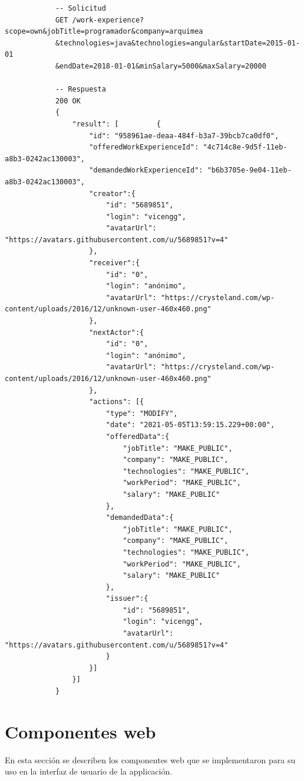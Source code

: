 \documentclass[a4paper, 12pt]{book}
\begin{document}
        {\footnotesize
    \begin{verbatim}
			-- Solicitud
			GET /work-experience?scope=own&jobTitle=programador&company=arquimea
			&technologies=java&technologies=angular&startDate=2015-01-01
			&endDate=2018-01-01&minSalary=5000&maxSalary=20000

			-- Respuesta
			200 OK
			{
			    "result": [			{
			        "id": "958961ae-deaa-484f-b3a7-39bcb7ca0df0",
			        "offeredWorkExperienceId": "4c714c8e-9d5f-11eb-a8b3-0242ac130003",
			        "demandedWorkExperienceId": "b6b3705e-9e04-11eb-a8b3-0242ac130003",
			        "creator":{
			            "id": "5689851",
			            "login": "vicengg",
			            "avatarUrl": "https://avatars.githubusercontent.com/u/5689851?v=4"
			        },
			        "receiver":{
			            "id": "0",
			            "login": "anónimo",
			            "avatarUrl": "https://crysteland.com/wp-content/uploads/2016/12/unknown-user-460x460.png"
			        },
			        "nextActor":{
			            "id": "0",
			            "login": "anónimo",
			            "avatarUrl": "https://crysteland.com/wp-content/uploads/2016/12/unknown-user-460x460.png"
			        },
			        "actions": [{
			            "type": "MODIFY",
			            "date": "2021-05-05T13:59:15.229+00:00",
			            "offeredData":{
			                "jobTitle": "MAKE_PUBLIC",
			                "company": "MAKE_PUBLIC",
			                "technologies": "MAKE_PUBLIC",
			                "workPeriod": "MAKE_PUBLIC",
			                "salary": "MAKE_PUBLIC"
			            },
			            "demandedData":{
			                "jobTitle": "MAKE_PUBLIC",
			                "company": "MAKE_PUBLIC",
			                "technologies": "MAKE_PUBLIC",
			                "workPeriod": "MAKE_PUBLIC",
			                "salary": "MAKE_PUBLIC"
			            },
			            "issuer":{
			                "id": "5689851",
			                "login": "vicengg",
			                "avatarUrl": "https://avatars.githubusercontent.com/u/5689851?v=4"
			            }
			        }]
			    }]
			}
    \end{verbatim}
    }


    \section{Componentes web}
    \label{sec:web_components}
    En esta sección se describen los componentes web que se implementaron para su uso en la interfaz de usuario de la applicación.
\end{document}
